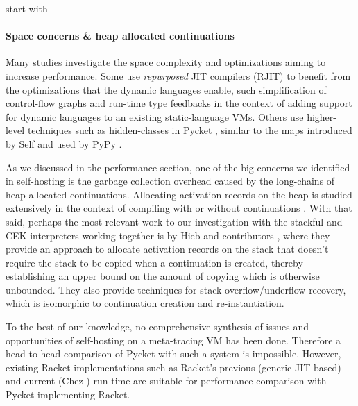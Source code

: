         \begin{paragraph-here}%
            start with \paragraph{Space concerns \& heap allocated continuations}

            Many studies investigate the space complexity and optimizations aiming
            to increase performance. Some use \emph{repurposed} JIT compilers
            (RJIT) to benefit from the optimizations that the dynamic languages
            enable, such simplification of control-flow graphs
            \cite{dynStatComp:12} and run-time type feedbacks \cite{stJITdyn:12}
            in the context of adding support for dynamic languages to an existing
            static-language VMs. Others use higher-level techniques such as
            hidden-classes in Pycket \cite{pycketmain2}, similar to the maps
            introduced by Self \cite{self-maps:89} and used by PyPy
            \cite{runtime-feedback:11}.

            As we discussed in the performance section, one of the big concerns we
            identified in self-hosting is the garbage collection overhead caused
            by the long-chains of heap allocated continuations. Allocating
            activation records on the heap is studied extensively in the context
            of compiling with \cite{comp-cont:92} or without
            \cite{comp-without-cont:17} continuations \cite{whatever:19}. With
            that said, perhaps the most relevant work to our investigation with
            the stackful and CEK interpreters working together is by Hieb and
            contributors \cite{cont-heap-stack:90}, where they provide an approach
            to allocate activation records on the stack that doesn't require the
            stack to be copied when a continuation is created, thereby
            establishing an upper bound on the amount of copying which is
            otherwise unbounded. They also provide techniques for stack
            overflow/underflow recovery, which is isomorphic to continuation
            creation and re-instantiation.

            To the best of our knowledge, no comprehensive synthesis of issues and
            opportunities of self-hosting on a meta-tracing VM has been
            done. Therefore a head-to-head comparison of Pycket with such a system
            is impossible. However, existing Racket implementations such as
            Racket's previous (generic JIT-based) and current (Chez
            \cite{icfp2019}) run-time are suitable for performance
            comparison with Pycket implementing Racket.
        \end{paragraph-here}

